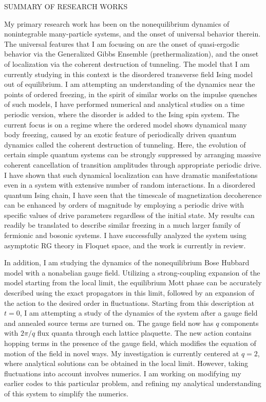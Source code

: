 \documentclass[a4paper,11pt]{article}
\begin{document}
\begin{CVstuff}{SUMMARY OF RESEARCH WORKS}
\end{CVstuff}
My primary research work has been on the nonequilibrium dynamics of nonintegrable many-particle systems, and the onset of universal behavior therein. The universal features that I am focusing on are the onset of quasi-ergodic behavior via the Generalized Gibbs Ensemble (prethermalization), and the onset of localization via the coherent destruction of tunneling. The model that I am currently studying in this context is the disordered transverse field Ising model out of equilibrium.  I am attempting an understanding of  the dynamics near the points of ordered freezing, in the spirit of similar works on the impulse quenches of such models, I have performed numerical and analytical studies on a time periodic version, where the disorder is added to the Ising spin system. The current focus is on a regime where the ordered model shows dynamical many body freezing, caused by an exotic feature of periodically driven  quantum dynamics called the coherent destruction of tunneling. Here, the evolution of certain simple 
quantum systems can be strongly suppressed by arranging massive coherent cancellation of transition amplitudes through appropriate periodic drive. I have shown that such dynamical localization can have dramatic manifestations even in a system with extensive number of random interactions. In a disordered quantum Ising chain, I have seen that the timescale of magnetization decoherence can be enhanced by orders of magnitude by employing a periodic drive with specific values of drive parameters regardless of the initial state. My results can readily be translated to describe similar freezing in a much larger family of fermionic and bosonic systems. I have successfully analyzed the system using asymptotic RG theory in Floquet space, and the work is currently in review.

In addition, I am studying the dynamics of the nonequilibrium Bose Hubbard model with a nonabelian gauge field. Utilizing a strong-coupling expansion of the model starting from the local limit, the equilibrium Mott phase can be accurately described using the exact propagators in this limit, followed by an expansion of the action to the desired order in fluctuations. Starting from this description at $t=0$, I am attempting a study of the dynamics of the system after a gauge field and annealed source terms are turned on. The gauge field now has $q$ components with $2\pi/q$ flux quanta through each lattice plaquette. The new action contains hopping terms in the presence of the gauge field, which modifies the equation of motion of the field in novel ways. My investigation is currently centered at $q=2$, where analytical solutions can be obtained in the local limit. However, taking fluctuations into account involves numerics. I am working on modifying my earlier codes to this particular problem, and refining my 
analytical understanding of this system to simplify the numerics. 
\end{document}
